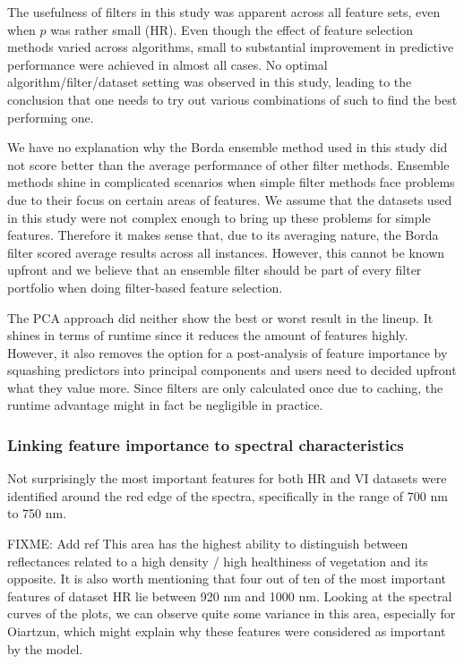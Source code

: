 \documentclass[letterpaper, peerreview]{IEEEtran}
\begin{document}
The usefulness of filters in this study was apparent across all feature sets, even when $p$ was rather small (HR).
Even though the effect of feature selection methods varied across algorithms, small to substantial improvement in predictive performance were achieved in almost all cases.
No optimal algorithm/filter/dataset setting was observed in this study, leading to the conclusion that one needs to try out various combinations of such to find the best performing one.

We have no explanation why the Borda ensemble method used in this study did not score better than the average performance of other filter methods.
Ensemble methods shine in complicated scenarios when simple filter methods face problems due to their focus on certain areas of features.
We assume that the datasets used in this study were not complex enough to bring up these problems for simple features.
Therefore it makes sense that, due to its averaging nature, the Borda filter scored average results across all instances.
However, this cannot be known upfront and we believe that an ensemble filter should be part of every filter portfolio when doing filter-based feature selection.

The PCA approach did neither show the best or worst result in the lineup.
It shines in terms of runtime since it reduces the amount of features highly.
However, it also removes the option for a post-analysis of feature importance by squashing predictors into principal components and users need to decided upfront what they value more.
Since filters are only calculated once due to caching, the runtime advantage might in fact be negligible in practice.

\subsubsection{Linking feature importance to spectral characteristics}

Not surprisingly the most important features for both HR and VI datasets were identified around the red edge of the spectra, specifically in the range of 700 nm to 750 nm.

FIXME: Add ref
This area has the highest ability to distinguish between reflectances related to a high density / high healthiness of vegetation and its opposite.
It is also worth mentioning that four out of ten of the most important features of dataset HR lie between 920 nm and 1000 nm.
Looking at the spectral curves of the plots, we can observe quite some variance in this area, especially for Oiartzun, which might explain why these features were considered as important by the model.
\end{document}
